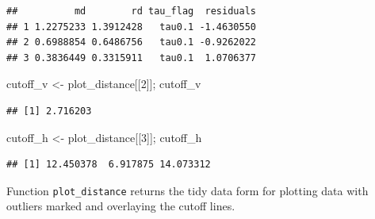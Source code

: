 \documentclass[11pt,a4paper,]{article}
\newenvironment{Shaded}{\begin{snugshade}}{\end{snugshade}}
\newcommand{\DecValTok}[1]{\textcolor[rgb]{0.00,0.00,0.81}{{#1}}}
\newcommand{\StringTok}[1]{\textcolor[rgb]{0.31,0.60,0.02}{{#1}}}
\newcommand{\NormalTok}[1]{{#1}}
\theoremstyle{definition}
\theoremstyle{definition}
\theoremstyle{remark}
\begin{document}
\begin{verbatim}
##          md        rd tau_flag  residuals
## 1 1.2275233 1.3912428   tau0.1 -1.4630550
## 2 0.6988854 0.6486756   tau0.1 -0.9262022
## 3 0.3836449 0.3315911   tau0.1  1.0706377
\end{verbatim}

\begin{Shaded}
\begin{Highlighting}[]
\NormalTok{cutoff_v <-}\StringTok{ }\NormalTok{plot_distance[[}\DecValTok{2}\NormalTok{]]; cutoff_v}
\end{Highlighting}
\end{Shaded}

\begin{verbatim}
## [1] 2.716203
\end{verbatim}

\begin{Shaded}
\begin{Highlighting}[]
\NormalTok{cutoff_h <-}\StringTok{ }\NormalTok{plot_distance[[}\DecValTok{3}\NormalTok{]]; cutoff_h}
\end{Highlighting}
\end{Shaded}

\begin{verbatim}
## [1] 12.450378  6.917875 14.073312
\end{verbatim}

Function \texttt{plot\_distance} returns the tidy data form for plotting
data with outliers marked and overlaying the cutoff lines.
\end{document}
